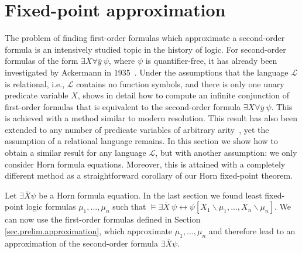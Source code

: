 \documentclass[acmsmall]{acmart}
\theoremstyle{plain}
\theoremstyle{definition}
\newcommand{\calL}{\mathcal{L}}
\newcommand{\mybar}[1]{\overline{#1}}
\begin{document}
\section{Fixed-point approximation}\label{sec.approximation}

The problem of finding first-order formulas which approximate a second-order formula is an
 intensively studied topic in the history of logic.
For second-order formulas of the form $\exists \mybar{X} \forall \mybar{y}~ \psi$, where $\psi$ is
 quantifier-free, it has already been investigated by Ackermann in 1935~\cite{Ackermann35Untersuchungen}.
Under the assumptions that the language $\calL$ is relational, i.e., $\calL$ contains no
 function symbols, and there is only one unary predicate variable $X$,
 \cite{Ackermann35Untersuchungen} shows in detail how to compute
 an infinite conjunction of first-order formulas that is equivalent to the second-order formula
 $\exists X \forall \mybar{y}~ \psi$.
This is achieved with a method similar to modern resolution.
This result has also been extended to any number of predicate variables of arbitrary
 arity~\cite{Ackermann35Untersuchungen,Wernhard17Approximating}, yet the assumption of
 a relational language remains.
In this section we show how to obtain a similar result for any language $\calL$, but with another assumption:
 we only consider Horn formula equations.
Moreover, this is attained with a completely different method as a straightforward corollary of our
 Horn fixed-point theorem.

Let $\exists \mybar{X} \psi$ be a Horn formula equation. In the last section we found least fixed-point logic formulas $\mu_1,...,\mu_n$ such that $\models \exists \mybar{X}  ~\psi \leftrightarrow \psi[X_1\backslash \mu_1,...,X_n\backslash\mu_n]$. We can now use the first-order formulas defined in Section \ref{sec.prelim.approximation}, which approximate $\mu_1,...,\mu_n$ and therefore lead to an approximation of the second-order formula $\exists \mybar{X} \psi$. 
\end{document}
